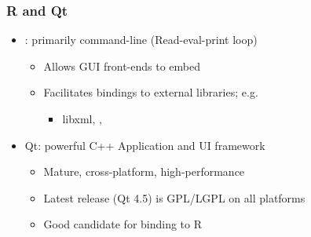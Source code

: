 \documentclass[compress]{beamer}
\begin{document}
\begin{frame}
  \titlepage
\end{frame}






\begin{frame}
  \frametitle{R and Qt}
  \begin{itemize}
  \item \R: primarily command-line (Read-eval-print loop)
    \begin{itemize}
    \item Allows GUI front-ends to embed \R
    \item Facilitates bindings to external libraries; e.g. 
      \begin{itemize}
      \item libxml, , 
      \end{itemize}
    \end{itemize}
  \item Qt: powerful C++ Application and UI framework
    \begin{itemize}
    \item Mature, cross-platform, high-performance
    \item Latest release (Qt 4.5) is GPL/LGPL on all platforms
    \item Good candidate for binding to R
    \end{itemize}
  \end{itemize}
\end{frame}
\end{document}
